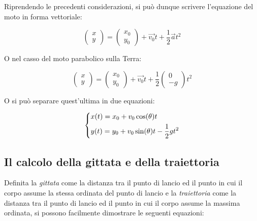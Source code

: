 \documentclass[oneside]{book}
\begin{document}
Riprendendo le precedenti considerazioni, si può dunque scrivere
l'equazione del moto in forma vettoriale:

\begin{equation}
    \begin{pmatrix}
        x \\
        y
    \end{pmatrix} = \begin{pmatrix}
        x_0 \\
        y_0
    \end{pmatrix} + \vec{v_0} t + \frac12 \vec{a} t^2
\end{equation}

O nel casso del moto parabolico sulla Terra:

\begin{equation}
    \begin{pmatrix}
        x \\
        y
    \end{pmatrix} = \begin{pmatrix}
        x_0 \\
        y_0
    \end{pmatrix} + \vec{v_0} t + \frac12 \begin{pmatrix}
        0 \\
        -g
    \end{pmatrix} t^2
\end{equation}

O si può separare quest'ultima in due equazioni:

\begin{equation}
    \begin{dcases}
        x(t)=x_0+v_0\cos(\theta)t \\
        y(t)=y_0+v_0\sin(\theta)t-\frac12gt^2
    \end{dcases}
\end{equation}

\subsection{Il calcolo della gittata e della traiettoria}

Definita la \textit{gittata} come la distanza tra il punto di lancio ed
il punto in cui il corpo assume la stessa ordinata del punto di lancio e
la \textit{traiettoria} come la distanza tra il punto di lancio ed il
punto in cui il corpo assume la massima ordinata, si possono facilmente
dimostrare le seguenti equazioni:
\end{document}
